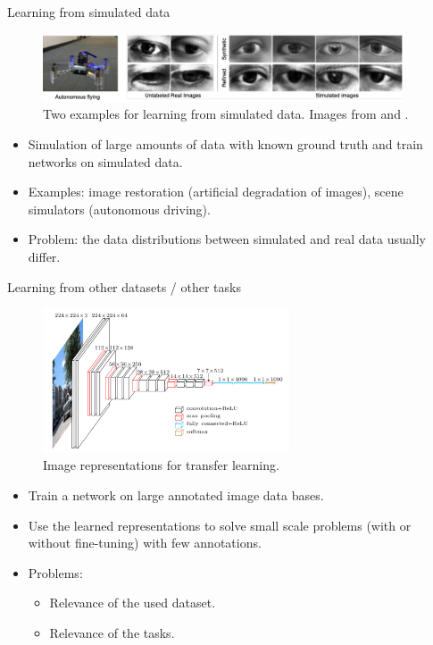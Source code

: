\documentclass[xcolor=pdftex,dvipsnames,table]{beamer}
\begin{document}
\begin{frame}{Learning from simulated data}
\begin{figure}[htb]
   \centering
   \includegraphics[width=0.95\textwidth]{../graphics/simulation_example.pdf}
   \caption{Two examples for learning from simulated data. Images from \cite{Kang2019} and \cite{Shrivastava2017}.}
\end{figure}
\begin{itemize}
   \item Simulation of large amounts of data with known ground truth and train networks on simulated data.
   \item Examples: image restoration (artificial degradation of images), scene simulators (autonomous driving).
   \item Problem: the data distributions between simulated and real data usually differ. 
\end{itemize}
\end{frame}


\begin{frame}{Learning from other datasets / other tasks}
\begin{figure}[htb]
   \centering
   \includegraphics[width=0.65\textwidth]{../graphics/vgg16.png}
   \caption{Image representations for transfer learning.}
\end{figure}
\begin{itemize}
   \item Train a network on large annotated image data bases.
   \item Use the learned representations to solve small scale problems (with or without fine-tuning) with few annotations.
   \item Problems:
   \begin{itemize}
   	\item Relevance of the used dataset.
   	\item Relevance of the tasks. 
   \end{itemize}
\end{itemize}
\end{frame}
\end{document}
